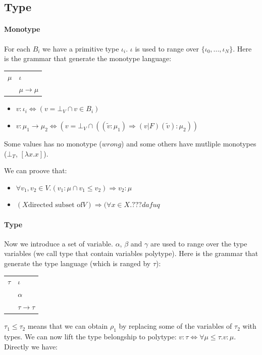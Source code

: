\documentclass[a4paper]{report}
\begin{document}
\subsection{Type}

\paragraph{Monotype} For each $B_i$ we have a primitive type $\iota_i$. $\iota$ is used to range over $\{\iota_0,...,\iota_N\}$. Here is the grammar that generate the monotype language:
\begin{tabular}{|r|l|}
\hline
$\mu$ & $\iota$\\
& $\mu \to \mu$\\
\hline
\end{tabular}

\begin{itemize}
\item $v : \iota_i \Leftrightarrow (v=\bot_V \cap v \in B_i)$
\item $v:\mu_1 \to\mu_2\Leftrightarrow (v=\bot_V \cap ((\tilde v : \mu_1)\Rightarrow(v|F)(\tilde v):\mu_2 ))$
\end{itemize}

Some values has no monotype ($wrong$) and some others have mutliple monotypes ($\bot_T$, $[\lambda x. x]$).

We can proove that:
\begin{itemize}
\item $\forall v_1,v_2 \in V.(v_1:\mu \cap v_1 \leq v_2) \Rightarrow v_2 :\mu$
\item $(X \mbox{directed subset of} V)\Rightarrow (\forall x \in X. ??? dafuq$
\end{itemize}

\paragraph{Type} Now we introduce a set of variable. $\alpha$, $\beta$ and $\gamma$ are used to range over the type variables (we call type that contain variables polytype). Here is the grammar that generate the type language (which is ranged by $\tau$):
\begin{tabular}{|r|l|}
\hline
$\tau$ & $\iota$\\
& $\alpha$\\
& $\tau \to \tau$\\
\hline
\end{tabular}

$\tau_1\leq\tau_2$ means that we can obtain $\rho_1$ by replacing some of the variables of $\tau_2$ with types. We can now lift the type belongship to polytype: $v:\tau \Leftrightarrow \forall \mu \leq \tau. v:\mu$. Directly we have:
\end{document}
